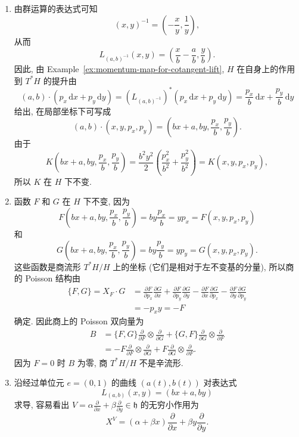 \begin{description}[font=\normalfont,leftmargin=2em,labelwidth=1.5em]
\begin{enumerate}[label=(\alph*),ref=\alph*,leftmargin=*]
\item 由群运算的表达式可知
\[
  (x,y)^{-1}=\left(-\frac xy,\frac1y\right),
\]
从而
\[
  L_{(a,b)^{-1}}(x,y)=\left(\frac xb-\frac ab,\frac yb\right).
\]
因此, 由 Example~\ref{ex:momentum-map-for-cotangent-lift}, $H$ 在自身上的作用到 $T^*H$ 的提升由
\[
  (a,b)\cdot(p_x\,\mathrm{d}x+p_y\,\mathrm{d}y)
   =(L_{(a,b)^{-1}})^*(p_x\,\mathrm{d}x+p_y\,\mathrm{d}y)
   =\frac{p_x}{b}\,\mathrm{d}x+\frac{p_y}{b}\,\mathrm{d}y
\]
给出, 在局部坐标下可写成
\[
  (a,b)\cdot(x,y,p_x,p_y)=\left(bx+a,by,\frac{p_x}{b},\frac{p_y}{b}\right).
\]
由于
\[
  K\left(bx+a,by,\frac{p_x}{b},\frac{p_y}{b}\right)
    =\frac{b^2y^2}{2}\left(\frac{p_x^2}{b^2}+\frac{p_y^2}{b^2}\right)
    =K(x,y,p_x,p_y),
\]
所以 $K$ 在 $H$ 下不变.
\item 函数 $F$ 和 $G$ 在 $H$ 下不变, 因为
\[
  F\left(bx+a,by,\frac{p_x}{b},\frac{p_y}{b}\right)
    =by\frac{p_x}{b}=yp_x=F(x,y,p_x,p_y)
\]
和
\[
  G\left(bx+a,by,\frac{p_x}{b},\frac{p_y}{b}\right)
    =by\frac{p_y}{b}=yp_y=G(x,y,p_x,p_y).
\]
这些函数是商流形 $T^*H/H$ 上的坐标 (它们是相对于左不变基的分量), 所以商的 Poisson 结构由
\begin{align*}
  \{F,G\}=X_F\cdot G
  &=\frac{\partial F}{\partial p_x}\frac{\partial G}{\partial x}
    +\frac{\partial F}{\partial p_y}\frac{\partial G}{\partial y}
    -\frac{\partial F}{\partial x}\frac{\partial G}{\partial p_x}
    -\frac{\partial F}{\partial y}\frac{\partial G}{\partial p_y}\\
  &=-p_xy=-F
\end{align*}
确定. 因此商上的 Poisson 双向量为
\begin{align*}
  B&=\{F,G\}\frac{\partial}{\partial F}\otimes\frac{\partial}{\partial G}
      +\{G,F\}\frac{\partial}{\partial G}\otimes\frac{\partial}{\partial F}\\
   &=-F\frac{\partial}{\partial F}\otimes\frac{\partial}{\partial G}
      +F\frac{\partial}{\partial G}\otimes\frac{\partial}{\partial F}.
\end{align*}
因为 $F=0$ 时 $B$ 为零, 商 $T^*H/H$ 不是辛流形.
\item 沿经过单位元 $e=(0,1)$ 的曲线 $(a(t),b(t))$ 对表达式
\[
  L_{(a,b)}(x,y)=(bx+a,by)
\]
求导, 容易看出 $V=\alpha\frac{\partial}{\partial x}+\beta\frac{\partial}{\partial y}\in\mathfrak h$ 的无穷小作用为
\[
  X^V=(\alpha+\beta x)\frac{\partial}{\partial x}+\beta y\frac{\partial}{\partial y}.
\]
\end{enumerate}
\end{description}
